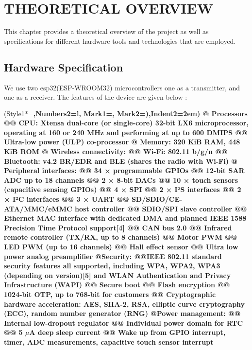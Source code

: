 \chapter{THEORETICAL OVERVIEW}
 \label{Chapter 3}

This chapter provides a theoretical overview of the project as well as specifications for different hardware tools and technologies that are employed.

\section{Hardware Specification}
We use two esp32(ESP-WROOM32) microcontrollers one as a transmitter, and one as a receiver. The features of the device are given below \cite{espDocs}:

\begin{easylist}
 \ListProperties(Style1*=\bfseries,Numbers2=l, Mark1={}, Mark2={)},Indent2=2em)
@ Processors
@@ CPU: Xtensa dual-core (or single-core) 32-bit LX6 microprocessor, operating at 160 or 240 MHz and performing at up to 600 DMIPS
@@ Ultra-low power (ULP) co-processor
@ Memory: 320 KiB RAM, 448 KiB ROM
@ Wireless connectivity:
@@ Wi-Fi: 802.11 b/g/n
@@ Bluetooth: v4.2 BR/EDR and BLE (shares the radio with Wi-Fi)
@ Peripheral interfaces:
@@ 34 × programmable GPIOs
@@ 12-bit SAR ADC up to 18 channels
@@ 2 × 8-bit DACs
@@ 10 × touch sensors (capacitive sensing GPIOs)
@@ 4 × SPI
@@ 2 × I²S interfaces
@@ 2 × I²C interfaces
@@ 3 × UART
@@ SD/SDIO/CE-ATA/MMC/eMMC host controller
@@ SDIO/SPI slave controller
@@ Ethernet MAC interface with dedicated DMA and planned IEEE 1588 Precision Time Protocol support[4]
@@ CAN bus 2.0
@@ Infrared remote controller (TX/RX, up to 8 channels)
@@ Motor PWM
@@ LED PWM (up to 16 channels)
@@ Hall effect sensor
@@ Ultra low power analog preamplifier
@Security:
@@IEEE 802.11 standard security features all supported, including WPA, WPA2, WPA3 (depending on   version)[5] and WLAN Authentication and Privacy Infrastructure (WAPI)
@@     Secure boot
@@     Flash encryption
@@     1024-bit OTP, up to 768-bit for customers
@@     Cryptographic hardware acceleration: AES, SHA-2, RSA, elliptic curve cryptography (ECC), random number generator (RNG)
@Power management:
@@     Internal low-dropout regulator
@@     Individual power domain for RTC
@@     5 $\mu$A deep sleep current
@@     Wake up from GPIO interrupt, timer, ADC measurements, capacitive touch sensor interrupt

\end{easylist}

